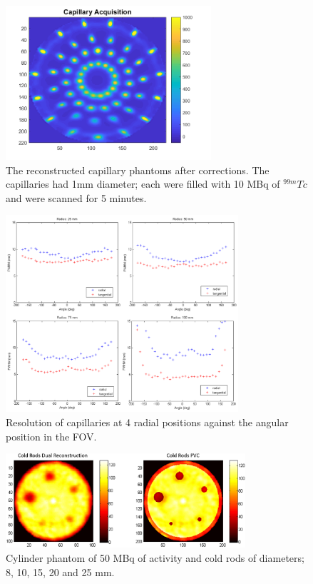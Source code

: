 \begin{figure}[!t]
\centering
\includegraphics[width=3in]{figures/Capillary_newLRF.PNG}

\caption{The reconstructed capillary phantoms after corrections. The capillaries had 1mm diameter; each were filled with 10 MBq of $^{99m}Tc$ and were scanned for 5 minutes.}
\label{fig_ImageRes}
\end{figure}

\begin{figure}[!t]
\centering
\includegraphics[width=3.4in]{figures/resolutions.png}

\caption{Resolution of capillaries at 4 radial positions against the angular position in the FOV.}
\label{fig_resolution}
\end{figure}

\begin{figure}[!t]
\centering
\includegraphics[width=3.5in]{figures/ColdRods.png}

\caption{Cylinder phantom of 50 MBq of activity and cold rods of diameters; 8, 10, 15, 20 and 25 mm.}
\label{fig_cold}
\end{figure}

